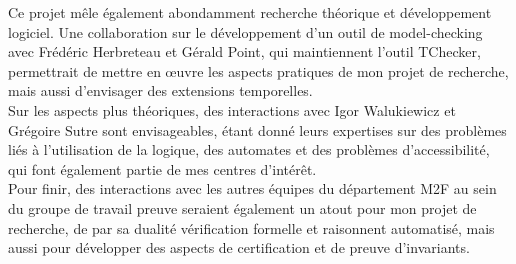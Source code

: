 Ce projet mêle également abondamment recherche théorique et
développement logiciel. Une collaboration sur le développement d'un outil de
model-checking avec Frédéric Herbreteau et Gérald Point, qui maintiennent
l'outil TChecker, permettrait de mettre en œuvre les aspects pratiques de mon
projet de recherche, mais aussi d'envisager des extensions temporelles.\\

Sur les aspects plus théoriques, des interactions avec Igor
Walukiewicz et Grégoire Sutre sont envisageables, étant donné leurs expertises
sur des problèmes liés à l'utilisation de la logique, des automates et des
problèmes d'accessibilité, qui font également partie de mes centres d'intérêt.\\

Pour finir, des interactions avec les autres équipes du département M2F au sein
du groupe de travail \og preuve \fg seraient également un atout pour mon projet
de recherche, de par sa dualité vérification formelle et raisonnent automatisé,
mais aussi pour développer des aspects de certification et de preuve d'invariants.
